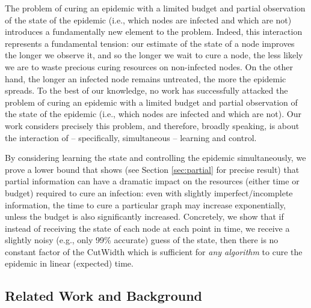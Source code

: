The problem of curing an epidemic with a limited budget and partial observation of the state of the epidemic (i.e., which nodes are infected and which are not) introduces a fundamentally new element to the problem. Indeed, this interaction represents a fundamental tension: our estimate of the state of a node improves the longer we observe it, and so the longer we wait to cure a node, the less likely we are to waste precious curing resources on non-infected nodes. On the other hand, the longer an infected node remains untreated, the more the epidemic spreads. To the best of our knowledge, no work has successfully attacked the problem of curing an epidemic with a limited budget and partial observation of the state of the epidemic (i.e., which nodes are infected and which are not). Our work considers precisely this problem, and therefore, broadly speaking, is about the interaction of -- specifically, simultaneous -- learning and control. 

By considering learning the state and controlling the epidemic simultaneously, we prove a lower bound that shows (see Section \ref{sec:partial} for precise result) that partial information can have a dramatic impact on the resources (either time or budget) required to cure an infection: even with slightly imperfect/incomplete information, the time to cure a particular graph may increase exponentially, unless the budget is also significantly increased. Concretely, we show that if instead of receiving the state of each node at each point in time, we receive a slightly noisy (e.g., only 99\% accurate) guess of the state, then there is no constant factor of the {\sc CutWidth} which is sufficient for {\em any algorithm} to cure the epidemic in linear (expected) time. 
 
\subsection{Related Work and Background}
\label{sec:related}


